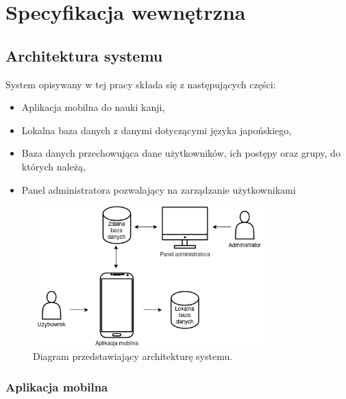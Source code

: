 \documentclass[a4paper,twoside,12pt]{book}
\begin{document}
\chapter{Specyfikacja wewnętrzna}
\label{ch:05}


\section{Architektura systemu}

System opisywany w tej pracy składa się z następujących części:
\begin{itemize}
\item Aplikacja mobilna do nauki kanji,
\item Lokalna baza danych z danymi dotyczącymi języka japońskiego,
\item Baza danych przechowująca dane użytkowników, ich postępy oraz grupy, do których należą,
\item Panel administratora pozwalający na zarządzanie użytkownikami
\end{itemize}

\begin{figure}[]
\centering
\includegraphics[width=0.8\textwidth]{archi}
\caption{Diagram przedstawiający architekturę systemu.}
\label{fig:archi}
\end{figure}

\subsection{Aplikacja mobilna}
\end{document}
